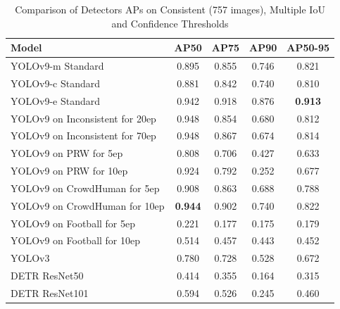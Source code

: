 \begin{table}[H]
    \centering
    \renewcommand{\arraystretch}{1.5}
    \setlength{\tabcolsep}{1em}
    \begin{tabular}{|l|c|c|c|c|}
        \hline
        \rowcolor{gray!25}
        \textbf{Model} & \textbf{AP50} & \textbf{AP75} & \textbf{AP90} & \textbf{AP50-95} \\ \hline
        YOLOv9-m Standard                & 0.895 & 0.855 & 0.746 & 0.821 \\ \hline
        YOLOv9-c Standard                & 0.881 & 0.842 & 0.740 & 0.810 \\ \hline
        YOLOv9-e Standard                & 0.942 & 0.918 & 0.876 & \textbf{0.913} \\ \hline
        YOLOv9 on Inconsistent for 20ep  & 0.948 & 0.854 & 0.680 & 0.812 \\ \hline
        YOLOv9 on Inconsistent for 70ep  & 0.948 & 0.867 & 0.674 & 0.814 \\ \hline
        YOLOv9 on PRW for 5ep            & 0.808 & 0.706 & 0.427 & 0.633 \\ \hline
        YOLOv9 on PRW for 10ep           & 0.924 & 0.792 & 0.252 & 0.677 \\ \hline
        YOLOv9 on CrowdHuman for 5ep     & 0.908 & 0.863 & 0.688 & 0.788 \\ \hline
        YOLOv9 on CrowdHuman for 10ep    & \textbf{0.944} & 0.902 & 0.740 & 0.822 \\ \hline
        YOLOv9 on Football for 5ep       & 0.221 & 0.177 & 0.175 & 0.179 \\ \hline
        YOLOv9 on Football for 10ep      & 0.514 & 0.457 & 0.443 & 0.452 \\ \hline
        YOLOv3                           & 0.780 & 0.728 & 0.528 & 0.672 \\ \hline
        DETR ResNet50                    & 0.414 & 0.355 & 0.164 & 0.315 \\ \hline
        DETR ResNet101                   & 0.594 & 0.526 & 0.245 & 0.460 \\ \hline
    \end{tabular}
    \caption{Comparison of Detectors APs on Consistent (757 images), Multiple IoU and Confidence Thresholds}
    \label{tab:APs_models_both}
\end{table}

